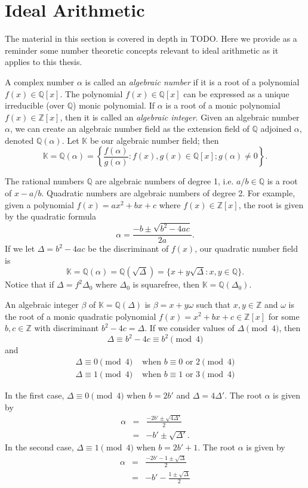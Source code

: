 \documentclass[11pt, letterpaper]{book}
\theoremstyle{definition}
\newcommand{\KK}{\mathbb{K}}
\newcommand{\ZZ}{\mathbb{Z}}
\newcommand{\QQ}{\mathbb{Q}}
\begin{document}
\setcounter{chapter}{1}
\chapter{Ideal Arithmetic}


The material in this section is covered in depth in TODO.  Here we provide as a reminder some number theoretic concepts relevant to ideal arithmetic as it applies to this thesis.


\bigbreak
A complex number $\alpha$ is called an \emph{algebraic number} if it is a root of a polynomial $f(x) \in \QQ[x]$.  The polynomial $f(x) \in \QQ[x]$ can be expressed as a unique irreducible (over $\QQ$) monic polynomial.  If $\alpha$ is a root of a monic polynomial $f(x) \in \ZZ[x]$, then it is called an \emph{algebraic integer}.  Given an algebraic number $\alpha$, we can create an algebraic number field as the extension field of $\QQ$ adjoined $\alpha$, denoted $\QQ(\alpha)$. Let $\KK$ be our algebraic number field; then
\[
	\KK = \QQ(\alpha) = \left\{ \frac{f(\alpha)}{g(\alpha)} : f(x), g(x) \in \QQ[x]; g(\alpha) \ne 0 \right\}.
\]


\bigbreak
The rational numbers $\QQ$ are algebraic numbers of degree 1, i.e. $a/b \in \QQ$ is a root of $x - a/b$.  Quadratic numbers are algebraic numbers of degree 2.  For example, given a polynomial $f(x) = ax^2 + bx + c$ where $f(x) \in \ZZ[x]$, the root is given by the quadratic formula
\[
	\alpha = \frac{-b \pm \sqrt{b^2 - 4ac}}{2a}.
\]
If we let $\Delta = b^2 -4ac$ be the discriminant of $f(x)$, our quadratic number field is 
\[
	\KK = \QQ(\alpha) = \QQ(\sqrt{\Delta}) = \{x + y\sqrt{\Delta} : x,y \in \QQ\}.
\]
Notice that if $\Delta = f^2 \Delta_0$ where $\Delta_0$ is squarefree, then $\KK = \QQ(\Delta_0)$.  


\bigbreak
An algebraic integer $\beta$ of $\KK = \QQ(\Delta)$ is $\beta = x+y \omega$ such that $x, y \in \ZZ$ and $\omega$ is the root of a monic quadratic polynomial $f(x) = x^2+bx+c \in \ZZ[x]$ for some $b,c \in \ZZ$ with discriminant $b^2-4c = \Delta$.  If we consider values of $\Delta \pmod 4$, then
\[
	\Delta \equiv b^2-4c \equiv b^2 \pmod 4
\]
and
\begin{eqnarray*}
		\Delta \equiv 0 \pmod 4 & \textrm{ when } b \equiv 0 \textrm{ or } 2 \pmod 4 \\
		\Delta \equiv 1 \pmod 4 & \textrm{ when } b \equiv 1 \textrm{ or } 3 \pmod 4
\end{eqnarray*}

In the first case, $\Delta \equiv 0 \pmod 4$ when $b=2b'$ and $\Delta = 4\Delta'$.  The root $\alpha$ is given by
\begin{eqnarray*}
	\alpha & = & \frac{-2b' \pm \sqrt{4\Delta'}}{2} \\
	& = & -b' \pm \sqrt{\Delta'}.
\end{eqnarray*}
In the second case, $\Delta \equiv 1 \pmod 4$ when $b=2b'+1$.  The root $\alpha$ is given by
\begin{eqnarray*}
	\alpha & = & \frac{-2b'-1 \pm \sqrt{\Delta}}{2} \\
	& = & -b' - \frac{1 \pm \sqrt{\Delta}}{2}
\end{eqnarray*}
\end{document}

